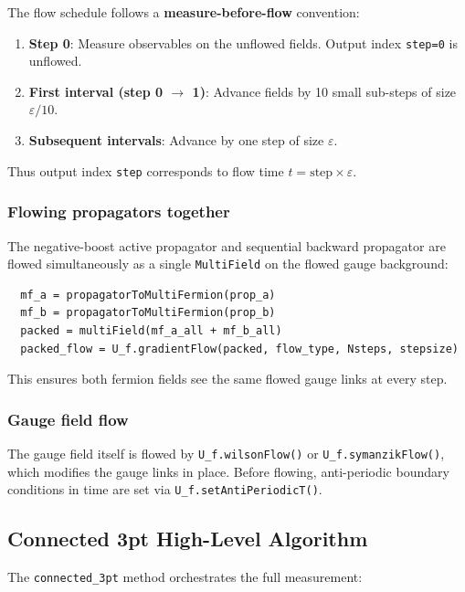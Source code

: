 \documentclass[11pt,a4paper]{article}
\newcommand{\code}[1]{\texttt{#1}}
\begin{document}
The flow schedule follows a \textbf{measure-before-flow} convention:

\begin{enumerate}[nosep]
  \item \textbf{Step 0}: Measure observables on the unflowed fields. Output index \code{step=0} is unflowed.
  \item \textbf{First interval (step 0 $\to$ 1)}: Advance fields by 10 small sub-steps of size $\varepsilon/10$.
  \item \textbf{Subsequent intervals}: Advance by one step of size $\varepsilon$.
\end{enumerate}

Thus output index \code{step} corresponds to flow time $t = \text{step} \times \varepsilon$.

\subsubsection{Flowing propagators together}

The negative-boost active propagator and sequential backward propagator are
flowed simultaneously as a single \code{MultiField} on the flowed gauge
background:

\begin{verbatim}
  mf_a = propagatorToMultiFermion(prop_a)
  mf_b = propagatorToMultiFermion(prop_b)
  packed = multiField(mf_a_all + mf_b_all)
  packed_flow = U_f.gradientFlow(packed, flow_type, Nsteps, stepsize)
\end{verbatim}

This ensures both fermion fields see the same flowed gauge links at every step.

\subsubsection{Gauge field flow}

The gauge field itself is flowed by \code{U\_f.wilsonFlow()} or \code{U\_f.symanzikFlow()}, which modifies the gauge links in place. Before flowing, anti-periodic boundary conditions in time are set via \code{U\_f.setAntiPeriodicT()}.

\subsection{Connected 3pt High-Level Algorithm}
\label{sec:connected_algorithm}

The \code{connected\_3pt} method orchestrates the full measurement:
\end{document}
